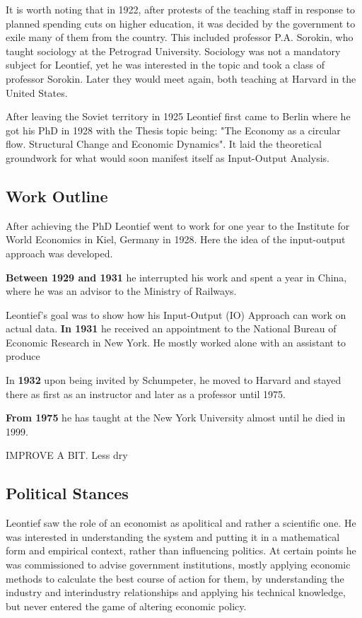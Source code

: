 \documentclass[12pt,a4paper]{scrartcl}
\begin{document}
	It is worth noting that in 1922, after protests of the teaching staff in response to planned spending cuts on higher education, it was decided by the government to exile many of them from the country. This included professor P.A. Sorokin, who taught sociology at the Petrograd University. Sociology was not a mandatory subject for Leontief, yet he was interested in the topic and took a class of professor Sorokin. Later they would meet again, both teaching at Harvard in the United States. \cite[p.353]{Kaliadina2006}
	
	After leaving the Soviet territory in 1925 Leontief first came to Berlin where he got his PhD in 1928 with the Thesis topic being: "The Economy as a circular flow. Structural Change and Economic Dynamics". It laid the theoretical groundwork for what would soon manifest itself as Input-Output Analysis.
	
	\subsection{Work Outline}
	
	After achieving the PhD Leontief went to work for one year to the Institute for World Economics in Kiel, Germany in 1928. Here the idea of the input-output approach was developed.
	
	\textbf{Between 1929 and 1931} he interrupted his work and spent a year in China, where he was an advisor to the Ministry of Railways.
	
	Leontief's goal was to show how his Input-Output (IO) Approach can work on actual data.	\textbf{In 1931} he received an appointment to the National Bureau of Economic Research in New York. He mostly worked alone with an assistant to produce
	
	In \textbf{1932} upon being invited by Schumpeter, he moved to Harvard and stayed there as first as an instructor and later as a professor until 1975. 
	
	\textbf{From 1975} he has taught at the New York University almost until he died in 1999.
	
	IMPROVE A BIT. Less dry
		
	\subsection{Political Stances}
	
	Leontief saw the role of an economist as apolitical and rather a scientific one. He was interested in understanding the system and putting it in a mathematical form and empirical context, rather than influencing politics. At certain points he was commissioned to advise government institutions, mostly applying economic methods to calculate the best course of action for them, by understanding the industry and interindustry relationships and applying his technical knowledge, but never entered the game of altering economic policy. \cite[p.21]{Hamilton2008}
	
\end{document}

